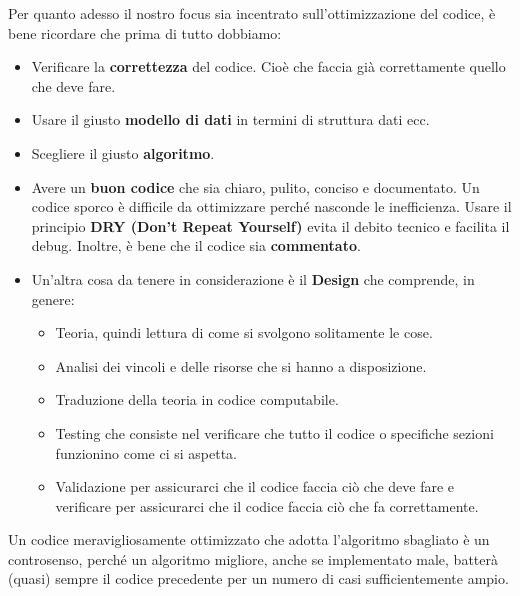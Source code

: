 Per quanto adesso il nostro focus sia incentrato sull'ottimizzazione del codice, è bene ricordare che prima di tutto dobbiamo:
\begin{itemize}
    \item Verificare la \textbf{correttezza} del codice. Cioè che faccia già correttamente quello che deve fare.
    \item Usare il giusto \textbf{modello di dati} in termini di struttura dati ecc.
    \item Scegliere il giusto \textbf{algoritmo}.
    \item Avere un \textbf{buon codice} che sia chiaro, pulito, conciso e documentato. Un codice sporco è difficile da ottimizzare perché nasconde le inefficienza. Usare il principio \textbf{DRY (Don’t Repeat Yourself)} evita il debito tecnico e facilita il debug. Inoltre, è bene che il codice sia \textbf{commentato}.
    \item Un'altra cosa da tenere in considerazione è il \textbf{Design} che comprende, in genere:
        \begin{itemize}
            \item Teoria, quindi lettura di come si svolgono solitamente le cose.
            \item Analisi dei vincoli e delle risorse che si hanno a disposizione.
            \item Traduzione della teoria in codice computabile.
            \item Testing che consiste nel verificare che tutto il codice o specifiche sezioni funzionino come ci si aspetta.
            \item Validazione per assicurarci che il codice faccia ciò che deve fare e verificare per assicurarci che il codice faccia ciò che fa correttamente.
        \end{itemize}
\end{itemize}
Un codice meravigliosamente ottimizzato che adotta l'algoritmo sbagliato è un controsenso, perché un algoritmo migliore, anche se implementato male, batterà (quasi) sempre il codice precedente per un numero di casi sufficientemente ampio.

